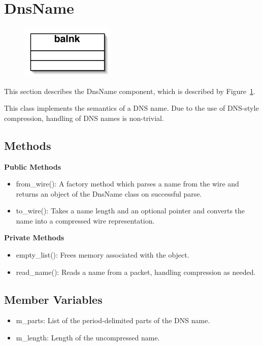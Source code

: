 \section{DnsName}\label{sec:dnsname}

\begin{figure}
\begin{center}
\includegraphics[width=0.4\textwidth]{figs/blank}
\end{center}
\caption{}
\label{fig:dnsname}
\end{figure}

This section describes the DnsName component, which is described by Figure~\ref{fig:dnsname}.  

This class implements the semantics of a DNS name. Due to the use of DNS-style compression, handling of DNS names is non-trivial.

\subsection{Methods}

{\bf Public Methods}
\begin{itemize}
\item from\_wire(): A factory method which parses a name from the wire and returns an object of the DnsName class on successful parse.
\item to\_wire(): Takes a name length and an optional pointer and converts the name into a compressed wire representation.
\end{itemize}

{\bf Private Methods}
\begin{itemize}
\item empty\_list(): Frees memory associated with the object.
\item read\_name(): Reads a name from a packet, handling compression as needed.
\end{itemize}

\subsection{Member Variables}
\begin{itemize}
\item m\_parts: List of the period-delimited parts of the DNS name.
\item m\_length: Length of the uncompressed name.
\end{itemize}
